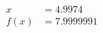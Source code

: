 \documentclass[preview]{standalone}
\begin{document}
\begin{align*}
x &= 4.9974\\f(x) &= 7.9999991
\end{align*}
\end{document}
